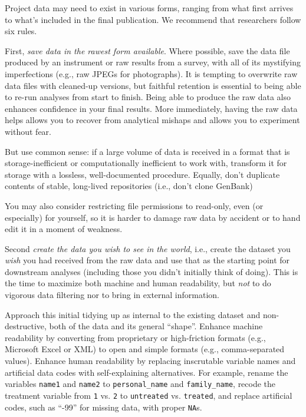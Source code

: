 \documentclass[10pt]{article}
\newcommand{\recommend}[1]{\textit{#1}}
\begin{document}
Project data may need to exist in various forms, ranging from what
first arrives to what's included in the final publication.  We
recommend that researchers follow six rules.

First, \recommend{save data in the rawest form available}.  Where
possible, save the data file produced by an instrument or raw results
from a survey, with all of its mystifying imperfections (e.g., raw
JPEGs for photographs). It is tempting to overwrite raw data files
with cleaned-up versions, but faithful retention is essential to being
able to re-run analyses from start to finish. Being able to produce
the raw data also enhances confidence in your final results. More
immediately, having the raw data helps allows you to recover from
analytical mishaps and allows you to experiment without fear.

But use common sense: if a large volume of data is received in a
format that is storage-inefficient or computationally inefficient to
work with, transform it for storage with a lossless, well-documented
procedure.  Equally, don't duplicate contents of stable, long-lived
repositories (i.e., don't clone GenBank)

You may also consider restricting file permissions to read-only, even
(or especially) for yourself, so it is harder to damage raw data by
accident or to hand edit it in a moment of weakness.

Second \recommend{create the data you wish to see in the world}, i.e.,
create the dataset you \emph{wish} you had received from the raw data
and use that as the starting point for downstream analyses (including
those you didn't initially think of doing). This is the time to
maximize both machine and human readability, but \emph{not} to do
vigorous data filtering nor to bring in external information.

Approach this initial tidying up as internal to the existing dataset and
non-destructive, both of the data and its general ``shape''. Enhance
machine readability by converting from proprietary or high-friction
formats (e.g., Microsoft Excel or XML) to open and simple formats (e.g.,
comma-separated values). Enhance human readability by replacing
inscrutable variable names and artificial data codes with
self-explaining alternatives. For example, rename the variables
\texttt{name1} and \texttt{name2} to \texttt{personal\_name} and
\texttt{family\_name}, recode the treatment variable from \texttt{1} vs.
\texttt{2} to \texttt{untreated} vs. \texttt{treated}, and replace
artificial codes, such as ``-99'' for missing data, with proper
\texttt{NA}s.
\end{document}
